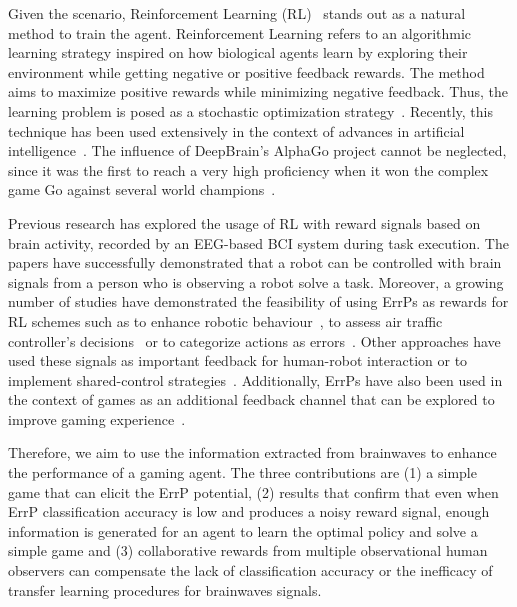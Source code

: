 \documentclass[journal]{IEEEtran}
\begin{document}
Given the scenario, Reinforcement Learning (RL)~\cite{Sutton2018} stands out as a natural method to train the agent.  Reinforcement Learning refers to an algorithmic learning strategy inspired on how biological agents learn by exploring their environment while getting negative or positive feedback rewards.  The method aims to maximize positive rewards while minimizing negative feedback.  Thus, the learning problem is posed as a stochastic optimization strategy~\cite{Santos1999}.  Recently, this technique has been used extensively in the context of advances in artificial intelligence~\cite{Nguyen2020}. The influence of DeepBrain's AlphaGo project cannot be neglected, since it was the first to reach a very high proficiency when it won the complex game Go against several world champions~\cite{ALPHA-GO}.


Previous research has explored the usage of RL with reward signals based on brain activity, recorded by an EEG-based BCI system during task execution. The papers \cite{ROBOT-CONTROL-PAPER,Kim2017,Omedes2013} have successfully demonstrated that a robot can be controlled with brain signals from a person who is observing a robot solve a task.  Moreover, a growing number of studies have demonstrated the feasibility of using ErrPs as rewards for RL schemes such as to enhance robotic behaviour~\cite{Luo2019}, to assess air traffic controller's decisions~\cite{Goh2019} or to categorize actions as errors~\cite{Wirth2020}. Other approaches have used these signals as important feedback for human-robot interaction or to implement shared-control strategies~\cite{Schiatti2018}.  Additionally, ErrPs have also been used in the context of games as an additional feedback channel that can be explored to improve gaming experience~\cite{Plass-OudeBos2010,kober2018bci}.

Therefore,  we aim to use the information extracted from brainwaves to enhance the performance of a gaming agent.  The three contributions are (1) a simple game that can elicit the ErrP potential, (2) results that confirm that even when ErrP classification accuracy is low and produces a noisy reward signal, enough information is generated for an agent to learn the optimal policy and solve a simple game and (3) collaborative rewards from multiple observational human observers can compensate the lack of classification accuracy or the inefficacy of transfer learning procedures for brainwaves signals.
\end{document}
